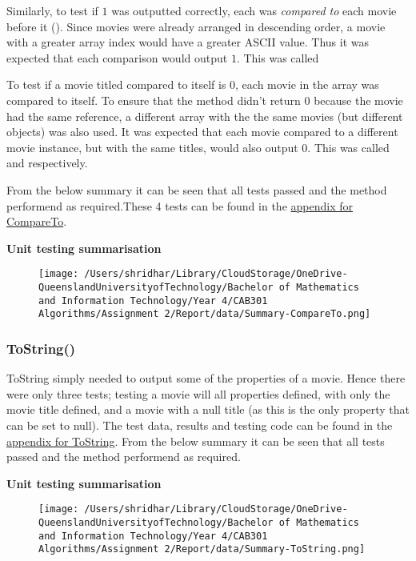 \documentclass[a4paper]{article}
\begin{document}
\noindent
Similarly, to test if $1$ was outputted correctly, each  was \textit{compared to} each movie before it (). Since movies were already arranged in descending order, a movie with a greater array index would have a greater ASCII value. Thus it was expected that each comparison would output $1$. This was called 
\vspace{3mm}

\noindent
To test if a movie titled compared to itself is $0$, each movie in the array was compared to itself. To ensure that the method didn't return $0$ because the movie had the same reference, a different array with the the same movies (but different objects) was also used. It was expected that each movie compared to a different movie instance, but with the same titles, would also output $0$. This was called  and  respectively. 
\vspace{1mm}

\noindent
From the below summary it can be seen that all tests passed and the method performend as required.These 4 tests can be found in the \hyperlink{subsubsection.5.2.1}{appendix for CompareTo}.
\vspace{3mm}

\noindent
\textbf{Unit testing summarisation}
\begin{figure}[H]
   \texttt{[image: /Users/shridhar/Library/CloudStorage/OneDrive-QueenslandUniversityofTechnology/Bachelor of Mathematics and Information Technology/Year 4/CAB301 Algorithms/Assignment 2/Report/data/Summary-CompareTo.png]}
\end{figure}

\subsubsection{ToString{()}}
ToString simply needed to output some of the properties of a movie. Hence there were only three tests; testing a movie will all properties defined, with only the movie title defined, and a movie with a null title (as this is the only property that can be set to null). The test data, results and testing code can be found in the \hyperlink{subsubsection.5.2.2}{appendix for ToString}. From the below summary it can be seen that all tests passed and the method performend as required.
\vspace{3mm}

\noindent
\textbf{Unit testing summarisation}
\begin{figure}[H]
   \texttt{[image: /Users/shridhar/Library/CloudStorage/OneDrive-QueenslandUniversityofTechnology/Bachelor of Mathematics and Information Technology/Year 4/CAB301 Algorithms/Assignment 2/Report/data/Summary-ToString.png]}
\end{figure}
\end{document}
